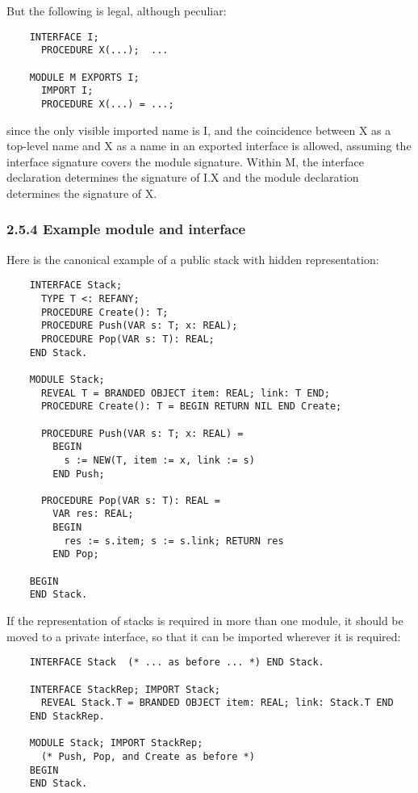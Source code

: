 \documentclass[10pt]{article}
\begin{document}
But the following is legal, although peculiar:
\begin{verbatim}
    INTERFACE I;
      PROCEDURE X(...);  ...

    MODULE M EXPORTS I;
      IMPORT I;
      PROCEDURE X(...) = ...;
\end{verbatim}

since the only visible imported name is I, and the coincidence between X as a top-level name and X as a name in an exported interface is allowed, assuming the interface signature covers the module signature. Within M, the interface declaration determines the signature of I.X and the module declaration determines the signature of X.

\subsubsection*{2.5.4 Example module and interface}

Here is the canonical example of a public stack with hidden representation:
\begin{verbatim}
    INTERFACE Stack;
      TYPE T <: REFANY;
      PROCEDURE Create(): T;
      PROCEDURE Push(VAR s: T; x: REAL);
      PROCEDURE Pop(VAR s: T): REAL;
    END Stack.

    MODULE Stack;
      REVEAL T = BRANDED OBJECT item: REAL; link: T END;
      PROCEDURE Create(): T = BEGIN RETURN NIL END Create;

      PROCEDURE Push(VAR s: T; x: REAL) =
        BEGIN
          s := NEW(T, item := x, link := s)
        END Push;

      PROCEDURE Pop(VAR s: T): REAL =
        VAR res: REAL;
        BEGIN
          res := s.item; s := s.link; RETURN res
        END Pop;

    BEGIN
    END Stack.
\end{verbatim}

If the representation of stacks is required in more than one module, it should be moved to a private interface, so that it can be imported wherever it is required:
\begin{verbatim}
    INTERFACE Stack  (* ... as before ... *) END Stack.

    INTERFACE StackRep; IMPORT Stack;
      REVEAL Stack.T = BRANDED OBJECT item: REAL; link: Stack.T END
    END StackRep.

    MODULE Stack; IMPORT StackRep;
      (* Push, Pop, and Create as before *)
    BEGIN
    END Stack.
\end{verbatim}
\end{document}
